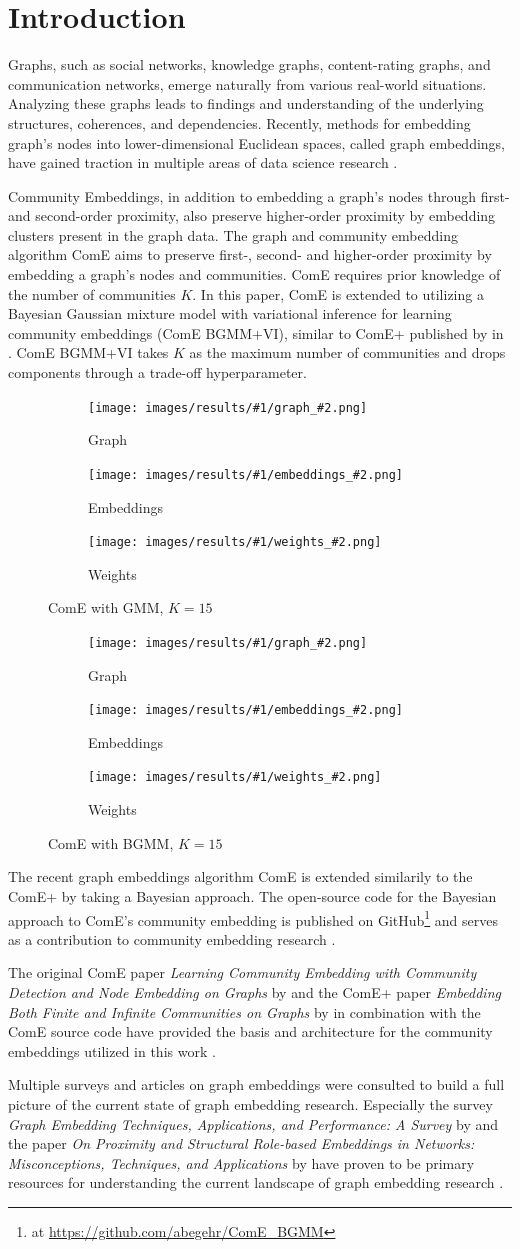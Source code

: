 \documentclass[conference]{IEEEtran}
\newcommand{\visresults}[2]{
    \begin{figure}[H]
        \centering
        \begin{subfigure}{.15\textwidth}
            \centering
            \texttt{[image: images/results/\#1/graph\_\#2.png]}
            \caption{Graph}
        \end{subfigure}%
        \begin{subfigure}{.15\textwidth}
            \centering
            \texttt{[image: images/results/\#1/embeddings\_\#2.png]}
            \caption{Embeddings}
        \end{subfigure}%
        \begin{subfigure}{.15\textwidth}
            \centering
            \texttt{[image: images/results/\#1/weights\_\#2.png]}
            \caption{Weights}
        \end{subfigure}%
        \caption{ComE with #1, $K=#2$}
        \label{fig:results#1#2}
    \end{figure}
}
\begin{document}
\section{Introduction}

Graphs, such as social networks, knowledge graphs, content-rating graphs, and communication networks, emerge naturally from various real-world situations. Analyzing these graphs leads to findings and understanding of the underlying structures, coherences, and dependencies. Recently, methods for embedding graph's nodes into lower-dimensional Euclidean spaces, called graph embeddings, have gained traction in multiple areas of data science research \cite{Goyal_2018}.

Community Embeddings, in addition to embedding a graph's nodes through first- and second-order proximity, also preserve higher-order proximity by embedding clusters present in the graph data. The graph and community embedding algorithm ComE aims to preserve first-, second- and higher-order proximity by embedding a graph's nodes and communities\cite{ComE}. ComE requires prior knowledge of the number of communities $K$. In this paper, ComE is extended to utilizing a Bayesian Gaussian mixture model with variational inference for learning community embeddings (ComE BGMM+VI), similar to ComE+ published by \citeauthor{ComE+} in \citeyear{ComE+} \cite{ComE+}. ComE BGMM+VI takes $K$ as the maximum number of communities and drops components through a trade-off hyperparameter.

\visresults{GMM}{15}
\visresults{BGMM}{15}

The recent \citeyear{ComE} graph embeddings algorithm ComE is extended similarily to the \citeyear{ComE+} ComE+ by taking a Bayesian approach. The open-source code for the Bayesian approach to ComE's community embedding is published on GitHub\footnote{at \url{https://github.com/abegehr/ComE_BGMM}} and serves as a contribution to community embedding research \cite{ComE_BGMM_GH}.

The original ComE paper \textit{Learning Community Embedding with Community Detection and Node Embedding on Graphs} by \citeauthor{ComE} and the ComE+ paper \textit{Embedding Both Finite and Infinite Communities on Graphs} by \citeauthor{ComE+} in combination with the ComE source code have provided the basis and architecture for the community embeddings utilized in this work \cite{ComE, ComE+, ComE_GH}.

Multiple surveys and articles on graph embeddings were consulted to build a full picture of the current state of graph embedding research. Especially the \citeyear{Goyal_2018} survey \textit{Graph Embedding Techniques, Applications, and Performance: A Survey} by \citeauthor{Goyal_2018} and the \citeyear{rossi20tkdd-roles} paper \textit{On Proximity and Structural Role-based Embeddings in Networks: Misconceptions, Techniques, and Applications} by \citeauthor{rossi20tkdd-roles} have proven to be primary resources for understanding the current landscape of graph embedding research \cite{Goyal_2018, rossi20tkdd-roles}.
\end{document}
